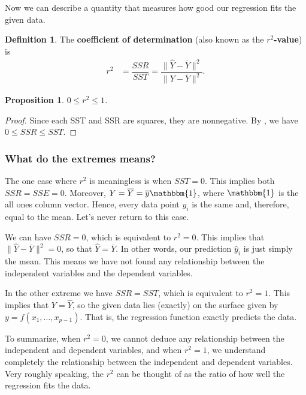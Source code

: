 \documentclass[a4paper, 12pt]{article}
\numberwithin{equation}{section}
\numberwithin{figure}{section}
\newtheorem{prop}[thm]{Proposition}
\theoremstyle{definition}
\newtheorem{defn}[thm]{Definition}
\renewcommand{\leq}{\leqslant}
\begin{document}
Now we can describe a quantity that measures how good our regression fits the
given data. 

\begin{defn}
	The \textbf{coefficient of determination} (also known as the
	\textbf{$r^2$-value}) is 
	\begin{align*} 
		r^2 &= \dfrac{SSR}{SST} = \dfrac{\|\widehat{Y} - \overline{Y}\|^2}{\| Y - \overline{Y}\|^2} .
	\end{align*} 
\end{defn}

\begin{prop}
	$0\leq r^2 \leq 1$.
\end{prop}

\begin{proof}
	Since each SST and SSR are squares, they are nonnegative. By
	, we have $0\leq SSR\leq SST$.
\end{proof}

\subsubsection{What do the extremes means?}

The one case where $r^2$ is meaningless is when $SST=0$. This implies both
$SSR=SSE=0$. Moreover, $Y = \overline{Y} = \overline{y} \mathbbm{1}$, where
$\mathbbm{1}$ is the all ones column vector. Hence, every data point $y_i$ is
the same and, therefore, equal to the mean. Let's never return to this case.

We can have $SSR=0$, which is equivalent to $r^2=0$. This implies that $\|
\widehat{Y} - \overline{Y}\|^2= 0$, so that $\widehat{Y} = \overline{Y}$. In
other words, our prediction $\widehat{y}_i$ is just simply the mean. This means
we have not found any relationship between the independent variables and the
dependent variables. 

In the other extreme we have $SSR=SST$, which is equivalent to $r^2=1$. This
implies that $Y = \widehat{Y}$, so the given data lies (exactly) on the surface
given by $y=f(x_1,\dots, x_{p-1})$. That is, the regression function exactly
predicts the data. 

To summarize, when $r^2=0$, we cannot deduce any relationship between the
independent and dependent variables, and when $r^2=1$, we understand completely
the relationship between the independent and dependent variables. Very roughly
speaking, the $r^2$ can be thought of as the ratio of how well the regression
fits the data. 
\end{document}
